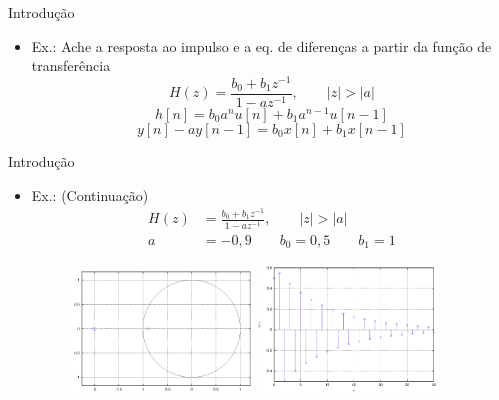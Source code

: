 \begin{slide}{Introdu\c c\~ao}
\begin{itemize}
   \item Ex.: Ache a resposta ao impulso e a eq. de diferenças a partir da função de transferência
   \begin{equation*}
      H(z)=\frac{b_0 + b_1z^{-1}}{1-az^{-1}}, \qquad |z|>|a|
   \end{equation*}
   \begin{equation*}
      h[n]=b_0a^nu[n] + b_1a^{n-1}u[n-1]
   \end{equation*}%
   \begin{equation*}
      y[n]-ay[n-1]=b_0x[n] + b_1x[n-1]
   \end{equation*}%
\end{itemize}
\end{slide}%

\begin{slide}{Introdu\c c\~ao}
\begin{itemize}
   \item Ex.: (Continuação)
   \begin{align*}
      H(z) &= \frac{b_0 + b_1z^{-1}}{1-az^{-1}}, \qquad |z|>|a| \\
      a &= -0,9\qquad b_0=0,5\qquad b_1=1
   \end{align*}
   \begin{figure}
      \centering
      \includegraphics[width = 0.45\textwidth]{figs/pol_zer1.eps}
      \includegraphics[width = 0.45\textwidth]{figs/imp_resp1.eps}
   \end{figure}
\end{itemize}
\end{slide}

